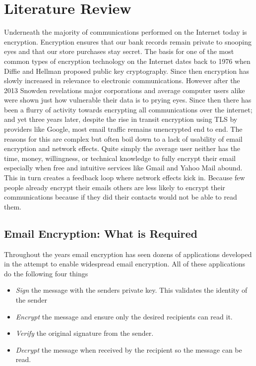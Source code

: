 \documentclass[11pt]{article}
\begin{document}
\section{Literature Review}
\par Underneath the majority of communications performed on the Internet today is encryption. Encryption ensures that our bank records remain private to snooping eyes and that our store purchases stay secret. The basis for one of the most common types of encryption technology on the Internet dates back to 1976 when Diffie and Hellman proposed public key cryptography. Since then encryption has slowly increased in relevance to electronic communications. However after the 2013 Snowden revelations major corporations and average computer users alike were shown just how vulnerable their data is to prying eyes. Since then there has been a flurry of activity towards encrypting all communications over the internet\cite{wired-encrypted-traffic}; and yet three years later, despite the rise in transit encryption using TLS by providers like Google\cite{gmail-tls-report}, most email traffic remains unencrypted end to end. The reasons for this are complex but often boil down to a lack of usability of email encryption and network effects. Quite simply the average user neither has the time, money, willingness, or technical knowledge to fully encrypt their email especially when free and intuitive services like Gmail and Yahoo Mail abound\cite{garfinkel2005make}. This in turn creates a feedback loop where network effects kick in. Because few people already encrypt their emails others are less likely to encrypt their communications because if they did their contacts would not be able to read them\cite{dingledine2006anonymity}.

\subsection{Email Encryption: What is Required}
Throughout the years email encryption has seen dozens of applications developed in the attempt to enable widespread email encryption. All of these applications do the following four things

\begin{itemize}
  \item \textit{Sign} the message with the senders private key. This validates the identity of the sender
  \item \textit{Encrypt} the message and ensure only the desired recipients can read it.
  \item \textit{Verify} the original signature from the sender.
  \item \textit{Decrypt} the message when received by the recipient so the message can be read.
\end{itemize}
\end{document}
